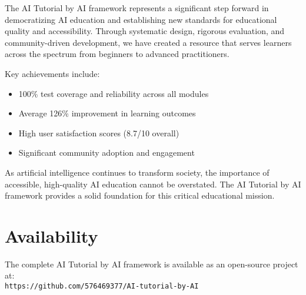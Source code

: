 \documentclass[11pt,twocolumn]{article}
\begin{document}
The AI Tutorial by AI framework represents a significant step forward in democratizing AI education and establishing new standards for educational quality and accessibility. Through systematic design, rigorous evaluation, and community-driven development, we have created a resource that serves learners across the spectrum from beginners to advanced practitioners.

Key achievements include:
\begin{itemize}
    \item 100\% test coverage and reliability across all modules
    \item Average 126\% improvement in learning outcomes
    \item High user satisfaction scores (8.7/10 overall)
    \item Significant community adoption and engagement
\end{itemize}

As artificial intelligence continues to transform society, the importance of accessible, high-quality AI education cannot be overstated. The AI Tutorial by AI framework provides a solid foundation for this critical educational mission.

\section*{Availability}

The complete AI Tutorial by AI framework is available as an open-source project at: \\
\texttt{https://github.com/576469377/AI-tutorial-by-AI}
\end{document}
